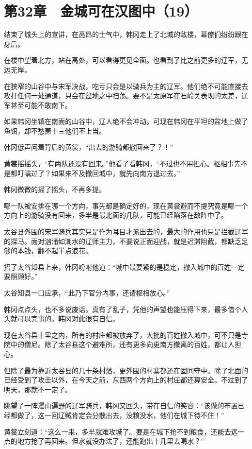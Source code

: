 \section{第32章　金城可在汉图中（19）}

结束了城头上的宣讲，在高昂的士气中，韩冈走上了北城的敌楼，幕僚们纷纷跟在身后。

在楼中望着北方，站在高处，可以看得更见全面。也看到了比之前更多的辽军，无边无岸。

在狭窄的山谷中与宋军决战，吃亏只会是以骑兵为主的辽军。他们绝不可能直接去攻打任何一处通道，只会在盆地之中扫荡。要不是太原军在石岭关表现的太差，辽军甚至可能不敢南下。

如果韩冈坐镇在南面的山谷中，辽人绝不会冲动。可现在韩冈在平坦的盆地上做了鱼饵，却不愁萧十三他们不上当。

韩冈低声问着背后的黄裳，“出去的游骑都撤回来了？！”

黄裳摇摇头，“有两队还没有回来。”他看了看韩冈，“不过也不用担心。枢相事先不是都叮嘱过了？如果来不及撤回城中，就先向南方退过去。”

韩冈微微的摇了摇头，不再多提。

哪一队被安排在哪一个方向，事先都是确定好的，现在黄裳避而不提究竟是哪一个方向上的游骑没有回来，多半是最北面的几队，可能已经陷落在敌阵中了。

太谷县外围的宋军骑兵其实只是作为耳目才派出去的，最大的作用也只是拦截辽军的探马。面对汹涌如潮水的辽师主力，不要说正面迎战，就是迟滞阻截，都缺乏足够的本钱，翻不起半点浪花。

招了太谷知县上来，韩冈吩咐他道：“城中最要紧的是稳定，撤入城中的百姓一定要照顾好。”

太谷知县一口应承，“此乃下官分内事，还请枢相放心。”

韩冈点点头，也不多说废话。真有了乱子，凭他的声望也能压得下来，最多借个人头就可以完事的。韩冈对此很有自信。

现在太谷县十里之内，所有的村庄都被放弃了，大批的百姓撤入城中，可不只是寺院中的僧尼。除了太谷县这个避难所，还有更多向更南方撤离的百姓，都让人担心。

但除了最为靠近太谷县的几十条村落，更外围的村寨都还在固囘守中。除了北面的已经受到了攻击以外，在今天之前，东西两个方向上的村庄都还算安全。不过到了明天，那就不一定了。

眺望了一阵漫山遍野的辽军骑兵，韩冈又回头，带在自信的笑容：“该做的布置已经都做了，这一回辽贼肯定会分散出去，没粮没水，他们在城下待不住！”

黄裳立刻道：“这么一来，多半就难攻城了。要是在城下抢不到粮食，还能去远一点的地方抢了再回来。但水就没办法了，还能跑出十几里去喝水？”

